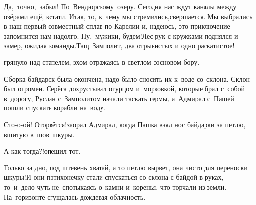 \diagdash Да,~точно,~забыл! По~Вендюрскому~озеру. Сегодня нас ждут каналы между озёрами ещё, кстати. Итак, то, к~чему мы стремились,\mdash свершается. Мы выбрались в наш первый совместный сплав по Карелии и, надеюсь, это приключение запомнится нам надолго. Ну,~мужики, будем!\mdash Лес рук с кружками поднялся и замер, ожидая команды.\mdash Тащ~Замполит, два отрывистых и одно раскатистое!


\mdash грянуло над стапелем, эхом отражаясь в светлом сосновом бору.



	
%	
%	


Сборка байдарок была окончена, надо было сносить их к~воде со~склона. Склон был огромен. Серёга дохрустывал огурцом и~морковкой, которые брал с~собой в~дорогу, Руслан с~Замполитом начали таскать гермы, а~Адмирал с~Пашей пошли спускать корабли на~воду.


\diagdash Сто-о-ой! Оторвётся!\mdash заорал Адмирал, когда Пашка взял нос байдарки за петлю, вшитую в~шов~шкуры.

\diagdash А как тогда?!\mdash опешил тот.

\diagdash Только за дно, под штевень хватай, а то петлю вырвет, она чисто для переноски шкуры!\mdash И они потихонечку стали спускаться со склона с байдой в руках, то~и~дело чуть не~спотыкаясь о~камни и~коренья, что торчали из земли. На~горизонте сгущалась дождевая облачность.

\begin{center}
\end{center}
